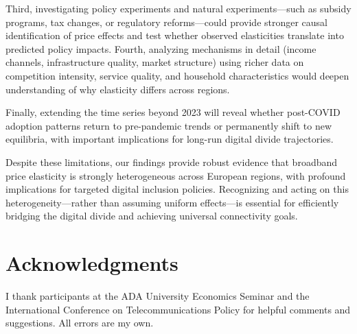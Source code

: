 \documentclass[12pt,review]{elsarticle}
\begin{document}
Third, investigating policy experiments and natural experiments—such as subsidy programs, tax changes, or regulatory reforms—could provide stronger causal identification of price effects and test whether observed elasticities translate into predicted policy impacts. Fourth, analyzing mechanisms in detail (income channels, infrastructure quality, market structure) using richer data on competition intensity, service quality, and household characteristics would deepen understanding of why elasticity differs across regions.

Finally, extending the time series beyond 2023 will reveal whether post-COVID adoption patterns return to pre-pandemic trends or permanently shift to new equilibria, with important implications for long-run digital divide trajectories.

Despite these limitations, our findings provide robust evidence that broadband price elasticity is strongly heterogeneous across European regions, with profound implications for targeted digital inclusion policies. Recognizing and acting on this heterogeneity—rather than assuming uniform effects—is essential for efficiently bridging the digital divide and achieving universal connectivity goals.

\section*{Acknowledgments}

I thank participants at the ADA University Economics Seminar and the International Conference on Telecommunications Policy for helpful comments and suggestions. All errors are my own.



\end{document}
